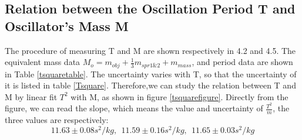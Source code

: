 \documentclass[12pt,a4paper]{article}
\begin{document}
\subsection{Relation between the Oscillation Period T and Oscillator's Mass M}
The procedure of measuring T and M are shown respectively in 4.2 and 4.5. The equivalent mass data $M_o=m_{obj}+\frac{1}{3}m_{spr1\&2}+m_{mass}$, and period data are shown in Table \ref{tsquaretable}. The uncertainty varies with T, so that the uncertainty of it is listed in table \ref{Tsquare}. Therefore,we can study the relation between T and M by linear fit $T^2$ with M, as shown in figure \ref{tsquarefigure}.
Directly from the figure, we can read the slope, which means the value and uncertainty of $\frac{T^2}{m}$, the three values are respectively:
$$11.63\pm0.08s^2/kg,~~11.59\pm0.16s^2/kg,~~11.65\pm0.03 s^2/kg$$ \par
\end{document}
